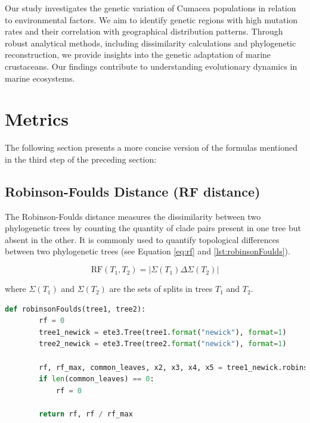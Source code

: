 Our study investigates the genetic variation of Cumacea populations in relation to environmental factors. We aim to identify genetic regions with high mutation rates and their correlation with geographical distribution patterns. Through robust analytical methods, including dissimilarity calculations and phylogenetic reconstruction, we provide insights into the genetic adaptation of marine crustaceans. Our findings contribute to understanding evolutionary dynamics in marine ecosystems.

\section{Metrics}\label{metrics}
The following section presents a more concise version of the formulas mentioned in the third step of the preceding section:

\subsection{Robinson-Foulds Distance (RF distance)}\label{RF}
The Robinson-Foulds distance measures the dissimilarity between two phylogenetic trees by counting the quantity of clade pairs present in one tree but absent in the other. It is commonly used to quantify topological differences between two phylogenetic trees (see Equation \eqref{eq:rf} and \autoref{lst:robinsonFoulds}).

\begin{equation}\label{eq:rf}
    \text{RF}(T_1, T_2) = | \Sigma(T_1) \Delta \Sigma(T_2) |
\end{equation}

where $\Sigma(T_1)$ and $\Sigma(T_2)$ are the sets of splits in trees $T_1$ and $T_2$.

\begin{lstlisting}[label=lst:robinsonFoulds,language=Python,caption=Python script for calculating the Robinson-Foulds distance using the ete3 package in the aPhyloGeo package]
    def robinsonFoulds(tree1, tree2):
        rf = 0
        tree1_newick = ete3.Tree(tree1.format("newick"), format=1)
        tree2_newick = ete3.Tree(tree2.format("newick"), format=1)

        rf, rf_max, common_leaves, x2, x3, x4, x5 = tree1_newick.robinson_foulds(tree2_newick, unrooted_trees=True)
        if len(common_leaves) == 0:
            rf = 0

        return rf, rf / rf_max
\end{lstlisting}


